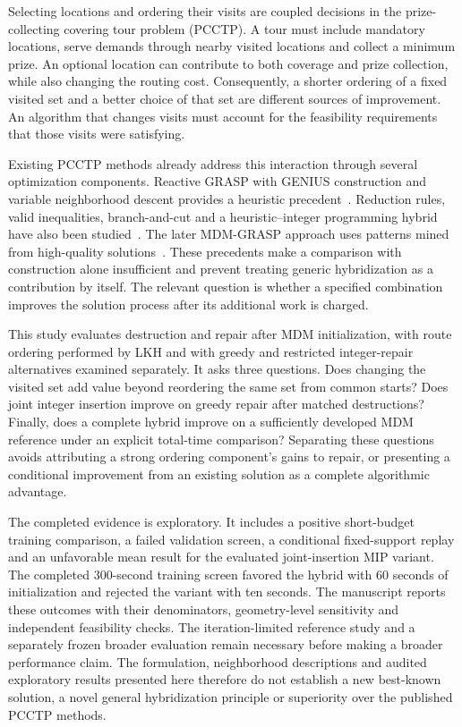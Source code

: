 Selecting locations and ordering their visits are coupled decisions in the
prize-collecting covering tour problem (PCCTP). A tour must include mandatory
locations, serve demands through nearby visited locations and collect a
minimum prize. An optional location can contribute to both coverage and
prize collection, while also changing the routing cost. Consequently, a
shorter ordering of a fixed visited set and a better choice of that set are
different sources of improvement. An algorithm that changes visits must
account for the feasibility requirements that those visits were satisfying.

Existing PCCTP methods already address this interaction through several
optimization components. Reactive GRASP with GENIUS construction and variable
neighborhood descent provides a heuristic precedent~\cite{climaco2021reactive}.
Reduction rules, valid inequalities, branch-and-cut and a heuristic--integer
programming hybrid have also been studied~\cite{climaco2023approaches}.
The later MDM-GRASP approach uses patterns mined from high-quality
solutions~\cite{climaco2026mdm}. These precedents make a comparison with
construction alone insufficient and prevent treating generic hybridization
as a contribution by itself. The relevant question is whether a specified
combination improves the solution process after its additional work is charged.

This study evaluates destruction and repair after MDM initialization, with
route ordering performed by LKH and with greedy and restricted integer-repair
alternatives examined separately. It asks three questions. Does changing the
visited set add value beyond reordering the same set from common starts?
Does joint integer insertion improve on greedy repair after matched
destructions? Finally, does a complete hybrid improve on a sufficiently
developed MDM reference under an explicit total-time comparison? Separating
these questions avoids attributing a strong ordering component's gains to
repair, or presenting a conditional improvement from an existing solution
as a complete algorithmic advantage.

The completed evidence is exploratory. It includes a positive short-budget
training comparison, a failed validation screen, a conditional fixed-support
replay and an unfavorable mean result for the evaluated joint-insertion MIP
variant. The completed 300-second training screen favored the hybrid with
60 seconds of initialization and rejected the variant with ten seconds.
The manuscript reports these outcomes with their denominators,
geometry-level sensitivity and independent feasibility checks. The
iteration-limited reference study and a separately frozen broader evaluation
remain necessary before making a broader performance claim. The formulation,
neighborhood descriptions and audited exploratory results presented here
therefore do not establish a new best-known solution, a novel general
hybridization principle or superiority over the published PCCTP methods.
